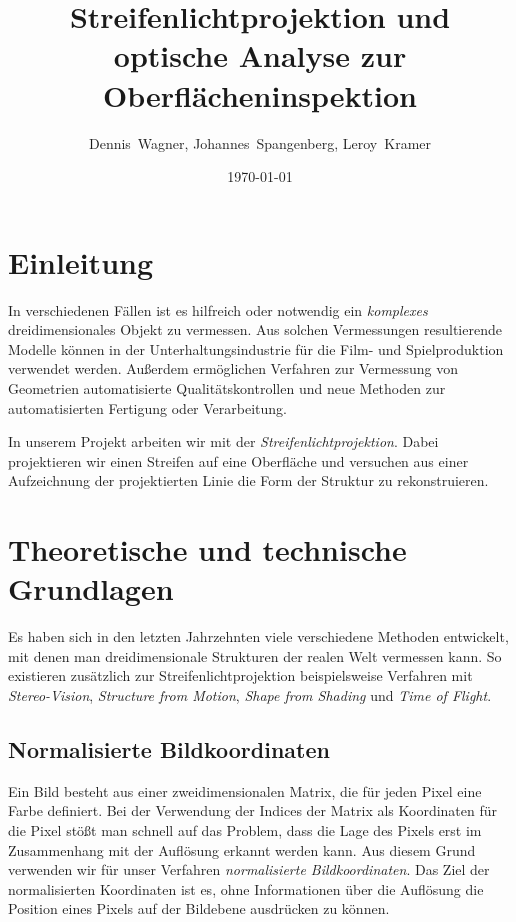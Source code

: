 \documentclass[ngerman,a4paper]{scrartcl}
\title%
{
	Streifenlichtprojektion und optische Analyse zur Oberflächeninspektion
}
\author[D. Wagner, J. Spangenberg, L. Kramer]
{
	Dennis~Wagner,
	Johannes~Spangenberg,
	Leroy~Kramer
}
\date{\today}
\begin{document}


\tableofcontents
\newpage


\section{Einleitung}

In verschiedenen Fällen ist es hilfreich oder notwendig ein \emph{komplexes} dreidimensionales Objekt zu vermessen. Aus solchen Vermessungen resultierende Modelle können in der Unterhaltungsindustrie für die Film- und Spielproduktion verwendet werden. Außerdem ermöglichen Verfahren zur Vermessung von Geometrien automatisierte Qualitätskontrollen und neue Methoden zur automatisierten Fertigung oder Verarbeitung.

In unserem Projekt arbeiten wir mit der \emph{Streifenlichtprojektion}. Dabei projektieren wir einen Streifen auf eine Oberfläche und versuchen aus einer Aufzeichnung der projektierten Linie die Form der Struktur zu rekonstruieren.


\section{Theoretische und technische Grundlagen}

Es haben sich in den letzten Jahrzehnten viele verschiedene Methoden entwickelt, mit denen man dreidimensionale Strukturen der realen Welt vermessen kann. So existieren zusätzlich zur Streifenlichtprojektion beispielsweise Verfahren mit \emph{Stereo-Vision}, \emph{Structure from Motion}, \emph{Shape from Shading} und \emph{Time of Flight}.

\subsection{Normalisierte Bildkoordinaten}

Ein Bild besteht aus einer zweidimensionalen Matrix, die für jeden Pixel eine Farbe definiert. Bei der Verwendung der Indices der Matrix als Koordinaten für die Pixel stößt man schnell auf das Problem, dass die Lage des Pixels erst im Zusammenhang mit der Auflösung erkannt werden kann. Aus diesem Grund verwenden wir für unser Verfahren \emph{normalisierte Bildkoordinaten}. Das Ziel der normalisierten Koordinaten ist es, ohne Informationen über die Auflösung die Position eines Pixels auf der Bildebene ausdrücken zu können.
\end{document}
